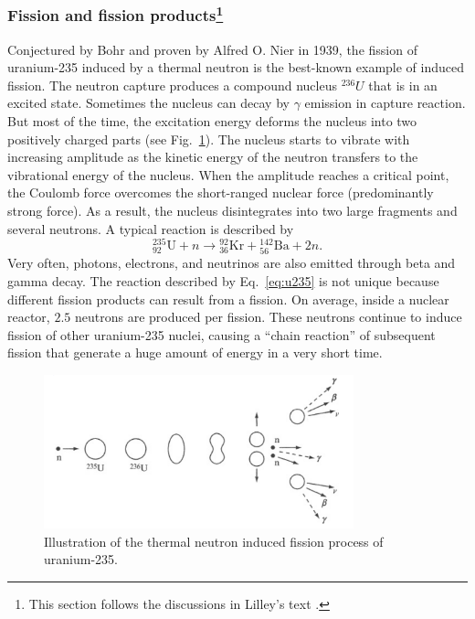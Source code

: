 \documentclass[nofootinbib,preprint,aps]{revtex4-1}
\begin{document}
    \subsubsection{Fission and fission products\footnote{
    This section follows the discussions in Lilley's text \cite[chapt. 10]{l01}.}}
        \label{sec:fission}
        Conjectured by Bohr and proven by Alfred O. Nier in 1939,
        the fission of uranium-235 induced by a thermal neutron
        is the best-known example of induced fission.\cite[chapt. 1]{gc01}
        The neutron capture produces a compound nucleus ${}^{236}U$ that is in an excited state.
        Sometimes the nucleus can decay by $\gamma$ emission in capture reaction.
        But most of the time, the excitation energy deforms the nucleus into two positively charged
        parts (see Fig.~\ref{fig:fission}).
        The nucleus starts to vibrate with increasing amplitude as the kinetic energy of the
        neutron transfers to the vibrational energy of the nucleus.
        When the
        amplitude reaches a critical point, the Coulomb force overcomes the short-ranged nuclear
        force (predominantly strong force). As a result, the nucleus disintegrates into two large fragments and several neutrons.
        A typical reaction is described by
        \begin{equation}
        {}^{235}_{92}\text{U} + n \rightarrow {}^{92}_{36}\text{Kr} + {}^{142}_{56}\text{Ba} + 2 n.
        \label{eq:u235}
        \end{equation}
        Very often, photons, electrons, and neutrinos are also emitted through beta and gamma decay.
        The reaction described by Eq.~\ref{eq:u235} is not unique because different fission products can result
        from a fission.
        On average, inside a nuclear reactor, $2.5$ neutrons are produced per fission. These neutrons
        continue to induce fission of other uranium-235 nuclei, causing a ``chain reaction'' of subsequent
        fission that generate a huge amount of energy in a very short time.
        \begin{figure}
            \centering
            \includegraphics[width=0.8\textwidth]{fission.png}
            \caption{Illustration of the thermal neutron induced fission process of uranium-235.\cite{l01}}
            \label{fig:fission}
        \end{figure}
\end{document}
